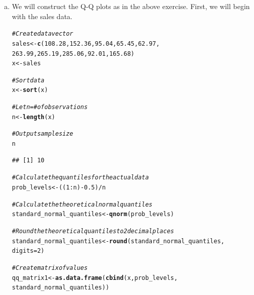 \documentclass[12pt]{article}\usepackage[]{graphicx}\usepackage[]{color}
\makeatletter
\newcommand{\hlnum}[1]{\textcolor[rgb]{0.686,0.059,0.569}{#1}}%
\newcommand{\hlcom}[1]{\textcolor[rgb]{0.678,0.584,0.686}{\textit{#1}}}%
\newcommand{\hlopt}[1]{\textcolor[rgb]{0,0,0}{#1}}%
\newcommand{\hlstd}[1]{\textcolor[rgb]{0.345,0.345,0.345}{#1}}%
\newcommand{\hlkwb}[1]{\textcolor[rgb]{0.69,0.353,0.396}{#1}}%
\newcommand{\hlkwc}[1]{\textcolor[rgb]{0.333,0.667,0.333}{#1}}%
\newcommand{\hlkwd}[1]{\textcolor[rgb]{0.737,0.353,0.396}{\textbf{#1}}}%
\newenvironment{kframe}{%
 \def\at@end@of@kframe{}%
 \ifinner\ifhmode%
  \def\at@end@of@kframe{\end{minipage}}%
  \begin{minipage}{\columnwidth}%
 \fi\fi%
 \def\FrameCommand##1{\hskip\@totalleftmargin \hskip-\fboxsep
 \colorbox{shadecolor}{##1}\hskip-\fboxsep
     \hskip-\linewidth \hskip-\@totalleftmargin \hskip\columnwidth}%
 \MakeFramed {\advance\hsize-\width
   \@totalleftmargin\z@ \linewidth\hsize
   \@setminipage}}%
 {\par\unskip\endMakeFramed%
 \at@end@of@kframe}
\newenvironment{knitrout}{}{} %
\makeatother
\begin{document}
\begin{enumerate}[a)]

\item We will construct the Q-Q plots as in the above exercise. First, we will begin with the sales data.

\begin{knitrout}
\color{fgcolor}\begin{kframe}
\begin{alltt}
\hlcom{#Create data vector}
\hlstd{sales} \hlkwb{<-} \hlkwd{c}\hlstd{(}\hlnum{108.28}\hlstd{,} \hlnum{152.36}\hlstd{,} \hlnum{95.04}\hlstd{,} \hlnum{65.45}\hlstd{,} \hlnum{62.97}\hlstd{,}
           \hlnum{263.99}\hlstd{,} \hlnum{265.19}\hlstd{,} \hlnum{285.06}\hlstd{,} \hlnum{92.01}\hlstd{,} \hlnum{165.68}\hlstd{)}
\hlstd{x} \hlkwb{<-} \hlstd{sales}

\hlcom{#Sort data}
\hlstd{x} \hlkwb{<-} \hlkwd{sort}\hlstd{(x)}

\hlcom{#Let n = # of observations}
\hlstd{n} \hlkwb{<-} \hlkwd{length}\hlstd{(x)}

\hlcom{#Output sample size}
\hlstd{n}
\end{alltt}
\begin{verbatim}
## [1] 10
\end{verbatim}
\begin{alltt}
\hlcom{#Calculate the quantiles for the actual data}
\hlstd{prob_levels} \hlkwb{<-} \hlstd{((}\hlnum{1}\hlopt{:}\hlstd{n)}\hlopt{-}\hlnum{0.5}\hlstd{)}\hlopt{/}\hlstd{n}

\hlcom{#Calculate the theoretical normal quantiles}
\hlstd{standard_normal_quantiles} \hlkwb{<-} \hlkwd{qnorm}\hlstd{(prob_levels)}

\hlcom{#Round the theoretical quantiles to 2 decimal places}
\hlstd{standard_normal_quantiles} \hlkwb{<-} \hlkwd{round}\hlstd{(standard_normal_quantiles,}
                                   \hlkwc{digits} \hlstd{=} \hlnum{2}\hlstd{)}

\hlcom{#Create matrix of values}
\hlstd{qq_matrix1} \hlkwb{<-} \hlkwd{as.data.frame}\hlstd{(}\hlkwd{cbind}\hlstd{(x, prob_levels,}
                                 \hlstd{standard_normal_quantiles))}


\end{alltt}
\end{kframe}
\end{knitrout}
\end{enumerate}
\end{document}
